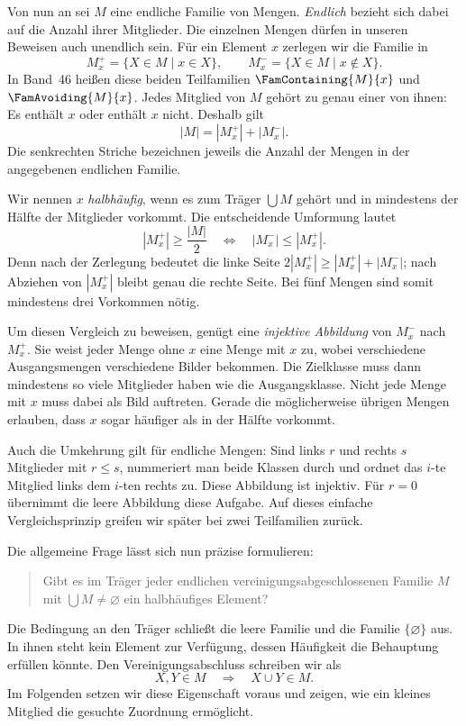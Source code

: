 Von nun an sei \(M\) eine endliche Familie von Mengen.
\emph{Endlich} bezieht sich dabei auf die Anzahl ihrer Mitglieder.
Die einzelnen Mengen dürfen in unseren Beweisen auch unendlich
sein. Für ein Element \(x\) zerlegen wir die Familie in
\[
  M_x^+=\{X\in M\mid x\in X\},
  \qquad
  M_x^-=\{X\in M\mid x\notin X\}.
\]
In Band~46 heißen diese beiden Teilfamilien
\(\FamContaining{M}{x}\) und \(\FamAvoiding{M}{x}\).
Jedes Mitglied von \(M\) gehört zu genau einer von ihnen:
Es enthält \(x\) oder enthält \(x\) nicht. Deshalb gilt
\[
  |M|=|M_x^+|+|M_x^-|.
\]
Die senkrechten Striche bezeichnen jeweils die Anzahl der
Mengen in der angegebenen endlichen Familie.

Wir nennen \(x\) \emph{halbhäufig}, wenn es zum Träger
\(\bigcup M\) gehört und in mindestens der Hälfte der
Mitglieder vorkommt. Die entscheidende Umformung lautet
\begin{equation}
  |M_x^+|\geq\frac{|M|}{2}
  \quad\Longleftrightarrow\quad
  |M_x^-|\leq|M_x^+|.
  \tag{H}\label{frankl-reading-half}
\end{equation}
Denn nach der Zerlegung bedeutet die linke Seite
\(2|M_x^+|\geq|M_x^+|+|M_x^-|\); nach Abziehen
von \(|M_x^+|\) bleibt genau die rechte Seite.
Bei fünf Mengen sind somit mindestens drei Vorkommen nötig.

Um diesen Vergleich zu beweisen, genügt eine \emph{injektive
Abbildung} von \(M_x^-\) nach \(M_x^+\). Sie weist jeder
Menge ohne \(x\) eine Menge mit \(x\) zu, wobei verschiedene
Ausgangsmengen verschiedene Bilder bekommen. Die Zielklasse
muss dann mindestens so viele Mitglieder haben wie die
Ausgangsklasse. Nicht jede Menge mit \(x\) muss dabei als
Bild auftreten. Gerade die möglicherweise übrigen Mengen
erlauben, dass \(x\) sogar häufiger als in der Hälfte vorkommt.

Auch die Umkehrung gilt für endliche Mengen: Sind links \(r\)
und rechts \(s\) Mitglieder mit \(r\leq s\), nummeriert man
beide Klassen durch und ordnet das \(i\)-te Mitglied links
dem \(i\)-ten rechts zu. Diese Abbildung ist injektiv.
Für \(r=0\) übernimmt die leere Abbildung diese Aufgabe.
Auf dieses einfache Vergleichsprinzip greifen wir später
bei zwei Teilfamilien zurück.

Die allgemeine Frage lässt sich nun präzise formulieren:
\begin{quote}
  Gibt es im Träger jeder endlichen vereinigungsabgeschlossenen
  Familie \(M\) mit \(\bigcup M\neq\varnothing\) ein
  halbhäufiges Element?
\end{quote}
Die Bedingung an den Träger schließt die leere Familie und
die Familie \(\{\varnothing\}\) aus. In ihnen steht kein
Element zur Verfügung, dessen Häufigkeit die Behauptung
erfüllen könnte. Den Vereinigungsabschluss schreiben wir als
\[
  X,Y\in M\quad\Longrightarrow\quad X\cup Y\in M.
\]
Im Folgenden setzen wir diese Eigenschaft voraus und zeigen,
wie ein kleines Mitglied die gesuchte Zuordnung ermöglicht.

